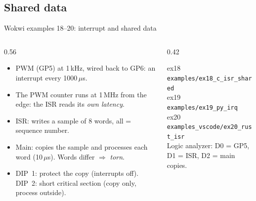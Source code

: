 \subsection{Shared data}
\begin{frame}{Wokwi examples 18--20: interrupt and shared data}
  \begin{columns}[T]
    \begin{column}{0.56\textwidth}
      \small
      \begin{itemize}
        \item PWM (GP5) at 1\,kHz, wired back to GP6: an interrupt every 1000\,$\mu$s.
        \item The PWM counter runs at 1\,MHz from the edge: the ISR reads its \emph{own latency}.
        \item ISR: writes a sample of 8 words, all = sequence number.
        \item Main: copies the sample and processes each word (10\,$\mu$s). Words differ $\Rightarrow$ \emph{torn}.
        \item DIP~1: protect the copy (interrupts off). DIP~2: short critical section (copy only, process outside).
      \end{itemize}
    \end{column}
    \begin{column}{0.42\textwidth}
      \begin{center}
      \end{center}
      \scriptsize
      ex18 \texttt{examples/ex18\_c\_isr\_shared}\\
      ex19 \texttt{examples/ex19\_py\_irq}\\
      ex20 \texttt{examples\_vscode/ex20\_rust\_isr}\\[0.5ex]
      Logic analyzer: D0 = GP5, D1 = ISR, D2 = main copies.
    \end{column}
  \end{columns}
\end{frame}

